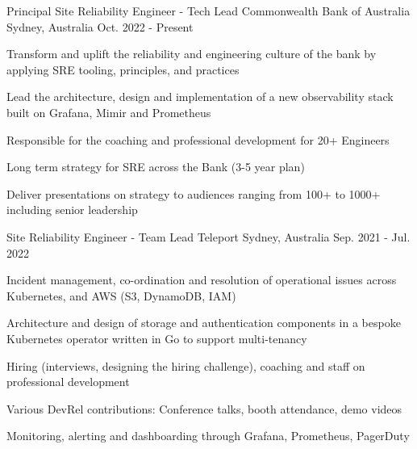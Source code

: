 

\begin{cventries}
  \cventry
    {Principal Site Reliability Engineer - Tech Lead} %
    {Commonwealth Bank of Australia} %
    {Sydney, Australia} %
    {Oct. 2022 - Present} %
    {
      \begin{cvitems} %
      \item {Transform and uplift the reliability and engineering culture of the bank by applying SRE tooling, principles, and practices} 
      \item {Lead the architecture, design and implementation of a new observability stack built on Grafana, Mimir and Prometheus}
      \item {Responsible for the coaching and professional development for 20+ Engineers}
      \item {Long term strategy for SRE across the Bank (3-5 year plan)}
      \item {Deliver presentations on strategy to audiences ranging from 100+ to 1000+ including senior leadership}
      \end{cvitems}
    }


  \cventry
    {Site Reliability Engineer - Team Lead} %
    {Teleport} %
    {Sydney, Australia} %
    {Sep. 2021 - Jul. 2022} %
    {
      \begin{cvitems} %
      \item {Incident management, co-ordination and resolution of operational issues across Kubernetes, and AWS (S3, DynamoDB, IAM)}
        \item {Architecture and design of storage and authentication components in a bespoke Kubernetes operator written in Go to support multi-tenancy}
        \item {Hiring (interviews, designing the hiring challenge), coaching and staff on professional development}
        \item {Various DevRel contributions: Conference talks, booth attendance, demo videos }
        \item {Monitoring, alerting and dashboarding through Grafana, Prometheus, PagerDuty}
      \end{cvitems}
    }



\end{cventries}
